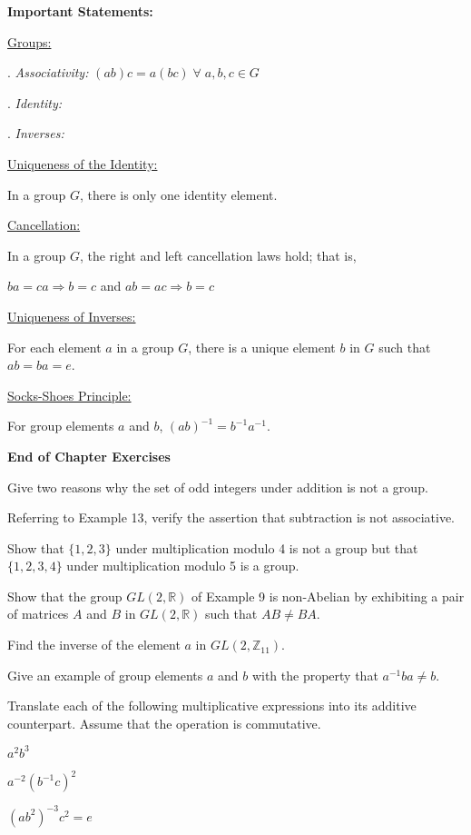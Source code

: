 \documentclass[11pt,largemargins]{homework}
\begin{document}
\maketitle

\textbf{\large{Important Statements:}}

\underline{Groups:}

. \textit{Associativity:} $(ab)c=a(bc) \;\forall\;a,b,c \in G$

. \textit{Identity:} 

. \textit{Inverses:}

\underline{Uniqueness of the Identity:}

\quad In a group $G$, there is only one identity element.

\underline{Cancellation:}

\quad In a group $G$, the right and left cancellation laws hold; that is, 

\quad $ba=ca \Rightarrow b=c$ and $ab=ac \Rightarrow b=c$

\underline{Uniqueness of Inverses:}

\quad For each element $a$ in a group $G$, there is a unique element $b$ in $G$ such that $ab=ba=e$.

\underline{Socks-Shoes Principle:}

\quad For group elements $a$ and $b$, $(ab)^{-1}=b^{-1}a^{-1}$.

\hfill

\textbf{\large{End of Chapter Exercises}}

\question
Give two reasons why the set of odd integers under addition is not a group.

\question
Referring to Example 13, verify the assertion that subtraction is not associative.


\question
Show that $\{1, 2, 3\}$ under multiplication modulo 4 is not a group but that $\{1,2,3,4\}$ under multiplication 
modulo 5 is a group.

\question
Show that the group $GL(2, \mathbb{R})$ of Example 9 is non-Abelian by exhibiting a pair of matrices $A$ and $B$ 
in $GL(2, \mathbb{R})$ such that $AB \neq BA$.


\question
Find the inverse of the element $a$ in $GL(2, \mathbb{Z}_{11})$.


\question
Give an example of group elements $a$ and $b$ with the property that $a^{-1}ba\neq b$.

\question
Translate each of the following multiplicative expressions into its additive counterpart. Assume that the operation 
is commutative.

\begin{alphaparts}
    \questionpart
    $a^2b^3$

    \questionpart
    $a^{-2}(b^{-1}c)^2$

    \questionpart
    $(ab^2)^{-3}c^2=e$

\end{alphaparts}
\end{document}
